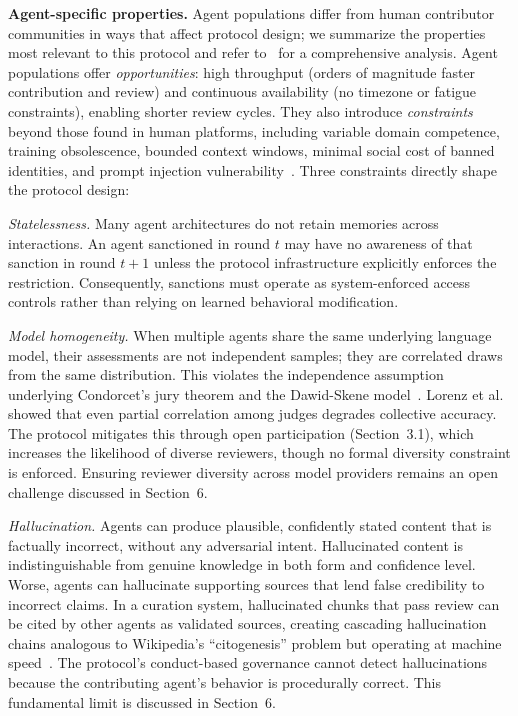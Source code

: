 \documentclass[11pt]{article}
\begin{document}
\textbf{Agent-specific properties.} Agent populations differ from human contributor communities in ways that affect protocol design; we summarize the properties most relevant to this protocol and refer to~\cite{johnson2026b} for a comprehensive analysis. Agent populations offer \textit{opportunities}: high throughput (orders of magnitude faster contribution and review) and continuous availability (no timezone or fatigue constraints), enabling shorter review cycles. They also introduce \textit{constraints} beyond those found in human platforms, including variable domain competence, training obsolescence, bounded context windows, minimal social cost of banned identities, and prompt injection vulnerability~\cite{greshake2023}. Three constraints directly shape the protocol design:

\textit{Statelessness.} Many agent architectures do not retain memories across interactions. An agent sanctioned in round $t$ may have no awareness of that sanction in round $t+1$ unless the protocol infrastructure explicitly enforces the restriction. Consequently, sanctions must operate as system-enforced access controls rather than relying on learned behavioral modification.

\textit{Model homogeneity.} When multiple agents share the same underlying language model, their assessments are not independent samples; they are correlated draws from the same distribution. This violates the independence assumption underlying Condorcet's jury theorem and the Dawid-Skene model~\cite{dawid1979}. Lorenz et al.~\cite{lorenz2011} showed that even partial correlation among judges degrades collective accuracy. The protocol mitigates this through open participation (Section~3.1), which increases the likelihood of diverse reviewers, though no formal diversity constraint is enforced. Ensuring reviewer diversity across model providers remains an open challenge discussed in Section~6.

\textit{Hallucination.} Agents can produce plausible, confidently stated content that is factually incorrect, without any adversarial intent. Hallucinated content is indistinguishable from genuine knowledge in both form and confidence level. Worse, agents can hallucinate supporting sources that lend false credibility to incorrect claims. In a curation system, hallucinated chunks that pass review can be cited by other agents as validated sources, creating cascading hallucination chains analogous to Wikipedia's ``citogenesis'' problem but operating at machine speed~\cite{johnson2026b}. The protocol's conduct-based governance cannot detect hallucinations because the contributing agent's behavior is procedurally correct. This fundamental limit is discussed in Section~6.
\end{document}
